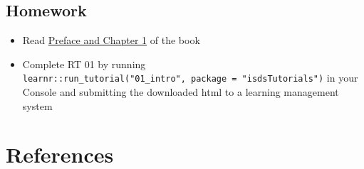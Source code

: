 \documentclass[
  letterpaper,
  DIV=11,
  numbers=noendperiod]{scrreprt}
\newlength{\cslhangindent}
\newlength{\cslentryspacingunit} %
\newenvironment{CSLReferences}[2] %
 {%
  \setlength{\parindent}{0pt}
  \ifodd #1
  \let\oldpar\par
  \def\par{\hangindent=\cslhangindent\oldpar}
  \fi
  \setlength{\parskip}{#2\cslentryspacingunit}
 }%
 {}
\begin{document}
\hypertarget{homework}{%
\section*{Homework}\label{homework}}

\begin{itemize}
\item
  Read \href{https://nustat.github.io/intro-stat-data-sci/}{Preface and
  Chapter 1} of the book
\item
  Complete RT 01 by running
  \texttt{learnr::run\_tutorial("01\_intro",\ package\ =\ "isdsTutorials")}
  in your Console and submitting the downloaded html to a learning
  management system
\end{itemize}


\hypertarget{references}{%
\chapter*{References}\label{references}}

\hypertarget{refs}{}
\begin{CSLReferences}{0}{0}
\end{CSLReferences}
\end{document}
